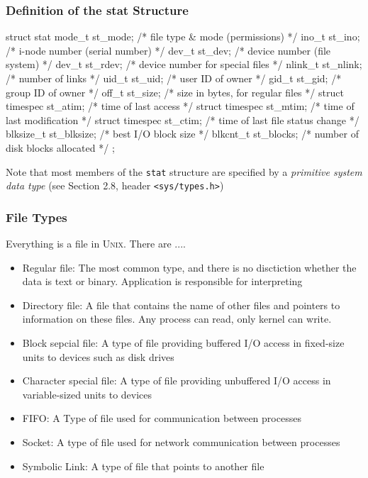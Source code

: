 \documentclass[newPxFont,sthlmFooter,nooffset]{beamer}
\begin{document}
\begin{frame}[containsverbatim,t]
  \frametitle{Definition of the stat Structure}
\begin{codedef}
struct stat {
   mode_t	st_mode;	/* file type & mode (permissions) */
   ino_t	st_ino;	/* i-node number (serial number) */
   dev_t	st_dev;	/* device number (file system) */
   dev_t	st_rdev;	/* device number for special files */
   nlink_t	st_nlink;	/* number of links */
   uid_t	st_uid;	        /* user ID of owner */
   gid_t	st_gid;	        /* group ID of owner */
   off_t	st_size;	/* size in bytes, for regular files */
   struct timespec st_atim;	/* time of last access */
   struct timespec st_mtim;	/* time of last modification */
   struct timespec st_ctim;	/* time of last file status change */
   blksize_t       st_blksize; /* best I/O block size */		
   blkcnt_t        st_blocks;  /* number of disk blocks allocated */		
};		
\end{codedef}

Note that most members of the \texttt{stat} structure are specified by a \textit{primitive system data type} (see Section 2.8, header \texttt{<sys/types.h>})
\end{frame}

\begin{frame}[t]
  \frametitle{File Types}
Everything is a file in \textsc{Unix}. There are .... 
\begin{itemize}
\item Regular file: {\footnotesize The most common type, and there is
    no disctiction whether the data is text or binary. Application is
    responsible for interpreting}
\item Directory file: {\footnotesize A file that contains the name of
    other files and pointers to information on these files. Any
    process can read, only kernel can write.}
\item Block sepcial file: {\footnotesize A type of file providing
    buffered I/O access in fixed-size units to devices such as disk
    drives}
\item Character special file: {\footnotesize A type of file providing
    unbuffered I/O access in variable-sized units to devices}
\item FIFO: {\footnotesize A Type of file used for communication
    between processes}
\item Socket: {\footnotesize A type of file used for network
    communication between processes}
\item Symbolic Link: {\footnotesize A type of file that points to another file}
\end{itemize}
\end{frame}
\end{document}
